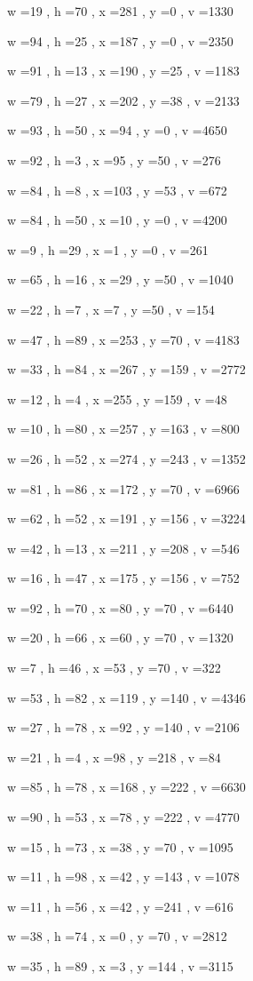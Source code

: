 \documentclass[11pt]{article}
\begin{document}
w =19 , h =70 , x =281 , y =0 , v =1330
\par
w =94 , h =25 , x =187 , y =0 , v =2350
\par
w =91 , h =13 , x =190 , y =25 , v =1183
\par
w =79 , h =27 , x =202 , y =38 , v =2133
\par
w =93 , h =50 , x =94 , y =0 , v =4650
\par
w =92 , h =3 , x =95 , y =50 , v =276
\par
w =84 , h =8 , x =103 , y =53 , v =672
\par
w =84 , h =50 , x =10 , y =0 , v =4200
\par
w =9 , h =29 , x =1 , y =0 , v =261
\par
w =65 , h =16 , x =29 , y =50 , v =1040
\par
w =22 , h =7 , x =7 , y =50 , v =154
\par
w =47 , h =89 , x =253 , y =70 , v =4183
\par
w =33 , h =84 , x =267 , y =159 , v =2772
\par
w =12 , h =4 , x =255 , y =159 , v =48
\par
w =10 , h =80 , x =257 , y =163 , v =800
\par
w =26 , h =52 , x =274 , y =243 , v =1352
\par
w =81 , h =86 , x =172 , y =70 , v =6966
\par
w =62 , h =52 , x =191 , y =156 , v =3224
\par
w =42 , h =13 , x =211 , y =208 , v =546
\par
w =16 , h =47 , x =175 , y =156 , v =752
\par
w =92 , h =70 , x =80 , y =70 , v =6440
\par
w =20 , h =66 , x =60 , y =70 , v =1320
\par
w =7 , h =46 , x =53 , y =70 , v =322
\par
w =53 , h =82 , x =119 , y =140 , v =4346
\par
w =27 , h =78 , x =92 , y =140 , v =2106
\par
w =21 , h =4 , x =98 , y =218 , v =84
\par
w =85 , h =78 , x =168 , y =222 , v =6630
\par
w =90 , h =53 , x =78 , y =222 , v =4770
\par
w =15 , h =73 , x =38 , y =70 , v =1095
\par
w =11 , h =98 , x =42 , y =143 , v =1078
\par
w =11 , h =56 , x =42 , y =241 , v =616
\par
w =38 , h =74 , x =0 , y =70 , v =2812
\par
w =35 , h =89 , x =3 , y =144 , v =3115
\par
\newpage
\end{document}
